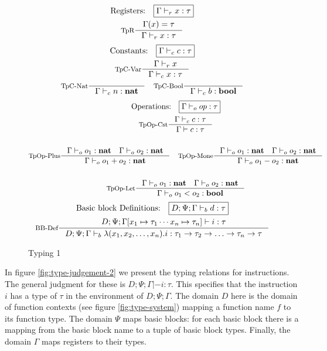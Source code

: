 \documentclass[a4paper, oneside, 10pt, draft]{memoir}
\begin{document}
\begin{figure}
  \begin{gather*}
    \text{Registers:} \quad \boxed{\Gamma \tpr x : \tau}\\
    \inference[TpR]{\Gamma(x) = \tau}{\Gamma \tpr x : \tau}
  \end{gather*}
  \begin{gather*}
    \text{Constants:} \quad \boxed{\Gamma \tpc c : \tau}\\
    \inference[TpC-Var]{\Gamma \tpr x}{\Gamma \tpc x : \tau}\\
    \inference[TpC-Nat]{}{\Gamma \tpc n : \tnat} \quad
    \inference[TpC-Bool]{}{\Gamma \tpc b : \tbool}
  \end{gather*}
  \begin{gather*}
    \text{Operations:} \quad \boxed{\Gamma \tpop op : \tau} \\
    \inference[TpOp-Cst]{\Gamma \tpc c : \tau}{\Gamma |- c : \tau}\\\\
    \inference[TpOp-Plus]{\Gamma \tpop o_1 : \tnat \quad \Gamma
      \tpop o_2 : \tnat}{\Gamma \tpop o_1 + o_2 : \tnat} \quad
    \inference[TpOp-Mone]{\Gamma \tpop o_1 : \tnat \quad \Gamma
      \tpop o_2 : \tnat}{\Gamma \tpop o_1 - o_2 : \tnat}\\\\
    \inference[TpOp-Let]{\Gamma \tpop o_1 : \tnat \quad \Gamma
      \tpop o_2 : \tnat}{\Gamma \tpop o_1 < o_2 : \tbool}
  \end{gather*}
  \begin{gather*}
    \text{Basic block Definitions:} \quad \boxed{D;\Psi;\Gamma \tpb d
      : \tau}\\
    \inference[BB-Def]{D;\Psi;\Gamma[x_1 \mapsto \tau_1 \dotsb x_n \mapsto \tau_n] |- i :
  \tau}{D;\Psi;\Gamma \tpb \lambda(x_1, x_2, \dotsc,
      x_n).i : \tau_1 -> \tau_2 -> \dotsc -> \tau_n -> \tau}
  \end{gather*}
  \caption{Typing 1}
  \label{fig:type-judgement-1}
\end{figure}

In figure \ref{fig:type-judgement-2} we present the typing relations
for instructions. The general judgment for these is
$\boxed{D;\Psi;\Gamma |- i : \tau}$. This specifies that the
instruction $i$ has a type of $\tau$ in the environment of
$D;\Psi;\Gamma$. The domain $D$ here is the domain of function
contexts (see figure \ref{fig:type-system}) mapping a function name
$f$ to its function type. The domain $\Psi$ maps basic blocks: for
each basic block there is a mapping from the basic block name to a
tuple of basic block types. Finally, the domain $\Gamma$ maps
registers to their types.
\end{document}

